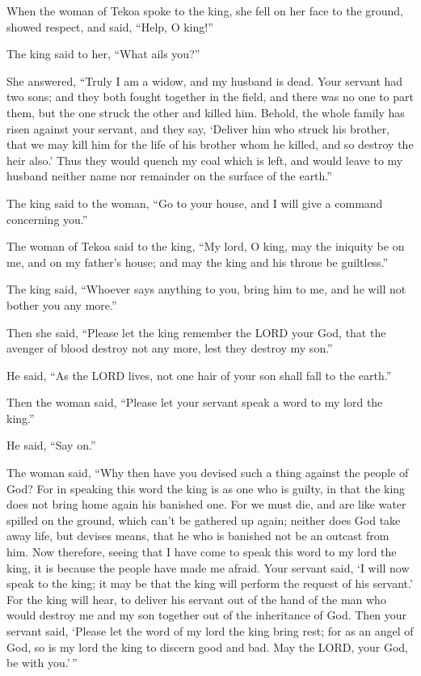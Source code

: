  When the woman of Tekoa spoke to the king, she fell on her
face to the ground, showed respect, and said, ``Help, O king!''

 The king said to her, ``What ails you?''

She answered, ``Truly I am a widow, and my husband is dead. 
Your servant had two sons; and they both fought together in the field,
and there was no one to part them, but the one struck the other and
killed him.  Behold, the whole family has risen against your
servant, and they say, `Deliver him who struck his brother, that we may
kill him for the life of his brother whom he killed, and so destroy the
heir also.' Thus they would quench my coal which is left, and would
leave to my husband neither name nor remainder on the surface of the
earth.''

 The king said to the woman, ``Go to your house, and I will
give a command concerning you.''

 The woman of Tekoa said to the king, ``My lord, O king, may
the iniquity be on me, and on my father's house; and may the king and
his throne be guiltless.''

 The king said, ``Whoever says anything to you, bring him
to me, and he will not bother you any more.''

 Then she said, ``Please let the king remember the LORD
your God, that the avenger of blood destroy not any more, lest they
destroy my son.''

He said, ``As the LORD lives, not one hair of your son shall fall to the
earth.''

 Then the woman said, ``Please let your servant speak a
word to my lord the king.''

He said, ``Say on.''

 The woman said, ``Why then have you devised such a thing
against the people of God? For in speaking this word the king is as one
who is guilty, in that the king does not bring home again his banished
one.  For we must die, and are like water spilled on the
ground, which can't be gathered up again; neither does God take away
life, but devises means, that he who is banished not be an outcast from
him.  Now therefore, seeing that I have come to speak this
word to my lord the king, it is because the people have made me afraid.
Your servant said, `I will now speak to the king; it may be that the
king will perform the request of his servant.'  For the
king will hear, to deliver his servant out of the hand of the man who
would destroy me and my son together out of the inheritance of God.
 Then your servant said, `Please let the word of my lord
the king bring rest; for as an angel of God, so is my lord the king to
discern good and bad. May the LORD, your God, be with you.'\,''

